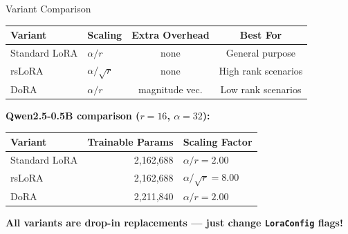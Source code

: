 \documentclass[aspectratio=169,10pt]{beamer}
\begin{document}
\begin{frame}{Variant Comparison}
	\begin{table}
		\centering
		\small
		\begin{tabular}{llcc}
			\toprule
			\textbf{Variant} & \textbf{Scaling}    & \textbf{Extra Overhead} & \textbf{Best For}   \\
			\midrule
			Standard LoRA    & $\alpha / r$        & none                    & General purpose     \\
			rsLoRA           & $\alpha / \sqrt{r}$ & none                    & High rank scenarios \\
			DoRA             & $\alpha / r$        & magnitude vec.          & Low rank scenarios  \\
			\bottomrule
		\end{tabular}
	\end{table}

	\vspace{0.3cm}
	\textbf{Qwen2.5-0.5B comparison ($r=16$, $\alpha=32$):}
	\begin{table}
		\centering
		\small
		\begin{tabular}{lrl}
			\toprule
			\textbf{Variant} & \textbf{Trainable Params} & \textbf{Scaling Factor}  \\
			\midrule
			Standard LoRA    & 2,162,688                 & $\alpha/r = 2.00$        \\
			rsLoRA           & 2,162,688                 & $\alpha/\sqrt{r} = 8.00$ \\
			DoRA             & 2,211,840                 & $\alpha/r = 2.00$        \\
			\bottomrule
		\end{tabular}
	\end{table}

	\vspace{0.2cm}
	\textbf{All variants are drop-in replacements --- just change \texttt{LoraConfig} flags!}
\end{frame}
\end{document}
